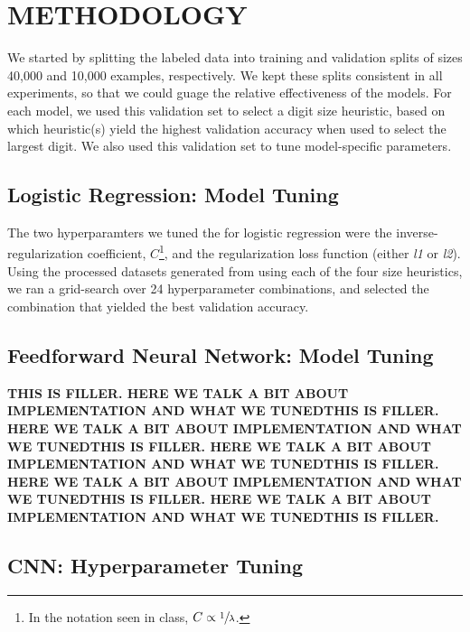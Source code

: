\documentclass[letterpaper, 10 pt, conference]{ieeeconf}  %
\begin{document}
\section{METHODOLOGY}

We started by splitting the labeled data into training and validation splits of sizes 40,000 and 10,000 examples, respectively. We kept these splits consistent in all experiments, so that we could guage the relative effectiveness of the models. For each model, we used this validation set to select a digit size heuristic, based on which heuristic(s) yield the highest validation accuracy when used to select the largest digit. We also used this validation set to tune model-specific parameters.

\subsection{Logistic Regression: Model Tuning} 

The two hyperparamters we tuned the for logistic regression were the inverse-regularization coefficient, $C$\footnote{In the notation seen in class, $C \propto \sfrac{1}{\lambda}$.}, and the regularization loss function (either \emph{l1} or \emph{l2}). Using the processed datasets generated from using each of the four size heuristics, we ran a grid-search over 24 hyperparameter combinations, and selected the combination that yielded the best validation accuracy.   

\subsection{Feedforward Neural Network: Model Tuning} 

\textbf{THIS IS FILLER. HERE WE TALK A BIT ABOUT IMPLEMENTATION AND WHAT WE TUNEDTHIS IS FILLER. HERE WE TALK A BIT ABOUT IMPLEMENTATION AND WHAT WE TUNEDTHIS IS FILLER. HERE WE TALK A BIT ABOUT IMPLEMENTATION AND WHAT WE TUNEDTHIS IS FILLER. HERE WE TALK A BIT ABOUT IMPLEMENTATION AND WHAT WE TUNEDTHIS IS FILLER. HERE WE TALK A BIT ABOUT IMPLEMENTATION AND WHAT WE TUNEDTHIS IS FILLER.}

\subsection{CNN: Hyperparameter Tuning} 
\end{document}
